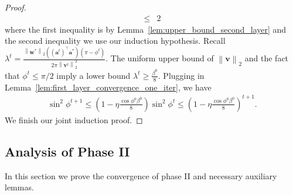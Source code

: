 \documentclass{article}
\newcommand{\firstlayer}{w}
\newcommand{\firstlayerWN}{v}
\newcommand{\secondlayer}{a}
\newcommand{\vect}[1]{\mathbf{#1}}
\newcommand{\norm}[1]{\left\|#1\right\|}
\begin{document}
\begin{proof}
\begin{align*}
\le & 2
\end{align*}
where the first inequality is by Lemma~\ref{lem:upper_bound_second_layer} and the second inequality we use our induction hypothesis.
Recall $\lambda^t = \frac{\norm{\vect{\firstlayer}^*}_2\left(\left(\vect{\secondlayer}^t\right)^\top\vect{\secondlayer}^*\right)\left(\pi-\phi^t\right)}{2\pi\norm{\vect{\firstlayerWN}^t}_2^2}$.
The uniform upper bound of $\norm{\vect{\firstlayerWN}}_2$ and the fact that $\phi^t \le \pi/2$ imply a lower bound $\lambda^t \ge \frac{\beta^0}{8}$.
Plugging in Lemma~\ref{lem:first_layer_convergence_one_iter}, we have \begin{align*}
\sin^2\phi^{t+1} \le \left(1-\eta \frac{\cos\phi^0\beta^0}{8}\right)\sin^2\phi^t \le \left(1-\eta \frac{\cos\phi^0\beta^0}{8}\right)^{t+1}.
\end{align*}
We finish our joint induction proof.
\end{proof}\subsection{Analysis of Phase II}\label{sec:analaysis_phase_2}
In this section we prove the convergence of phase II and necessary auxiliary lemmas.
\end{document}
